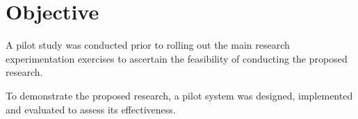 \section{Objective}
\label{sec:pilot-study:pilot-objective}

A pilot study was conducted prior to rolling out the main research
experimentation exercises to ascertain the feasibility of conducting the
proposed research.

To demonstrate the proposed research, a pilot system was designed, implemented
and evaluated to assess its effectiveness.